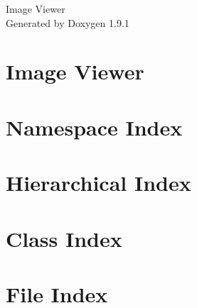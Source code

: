 \let\mypdfximage\pdfximage\def\pdfximage{\immediate\mypdfximage}\documentclass[twoside]{book}
\newcommand{\+}{\discretionary{\mbox{\scriptsize$\hookleftarrow$}}{}{}}
\newcommand{\clearemptydoublepage}{%
  \newpage{\pagestyle{empty}\cleardoublepage}%
}
\begin{document}
\raggedbottom

\hypersetup{pageanchor=false,
             bookmarksnumbered=true,
             pdfencoding=unicode
            }
\begin{titlepage}
\vspace*{7cm}
\begin{center}%
{\Large Image Viewer }\\
\vspace*{1cm}
{\large Generated by Doxygen 1.9.1}\\
\end{center}
\end{titlepage}
\clearemptydoublepage
{}
\tableofcontents
\clearemptydoublepage
{}
\hypersetup{pageanchor=true}

\chapter{Image Viewer}
\label{index}\hypertarget{index}{}
\chapter{Namespace Index}

\chapter{Hierarchical Index}

\chapter{Class Index}

\chapter{File Index}

\end{document}
